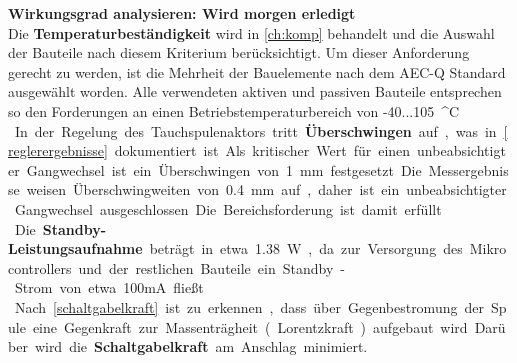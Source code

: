 \textbf{Wirkungsgrad analysieren: Wird morgen erledigt}\\
Die \textbf{Temperaturbeständigkeit} wird in \autoref{ch:komp} behandelt und die Auswahl der Bauteile nach diesem Kriterium berücksichtigt. Um dieser Anforderung gerecht zu werden, ist die Mehrheit der Bauelemente nach dem AEC-Q Standard ausgewählt worden. Alle verwendeten aktiven und passiven Bauteile entsprechen so den Forderungen an einen Betriebstemperaturbereich von -40...\SI{105}{^\circ C}.\\
In der Regelung des Tauchspulenaktors tritt \textbf{Überschwingen} auf, was in \autoref{reglerergebnisse} dokumentiert ist. Als kritischer Wert für einen unbeabsichtigter Gangwechsel ist ein Überschwingen von \SI{1}{mm} festgesetzt. Die Messergebnisse weisen Überschwingweiten von \SI{0,4}{mm} auf, daher ist ein unbeabsichtigter Gangwechsel ausgeschlossen. Die Bereichsforderung ist damit erfüllt.\\
Die \textbf{Standby-Leistungsaufnahme} beträgt in etwa \SI{1,38}{W}, da zur Versorgung des Mikrocontrollers und der restlichen Bauteile ein Standby-Strom von etwa 100mA fließt.\\
Nach \autoref{schaltgabelkraft} ist zu erkennen, dass über Gegenbestromung der Spule eine Gegenkraft zur Massenträgheit (Lorentzkraft) aufgebaut wird. Darüber wird die \textbf{Schaltgabelkraft} am Anschlag minimiert.

